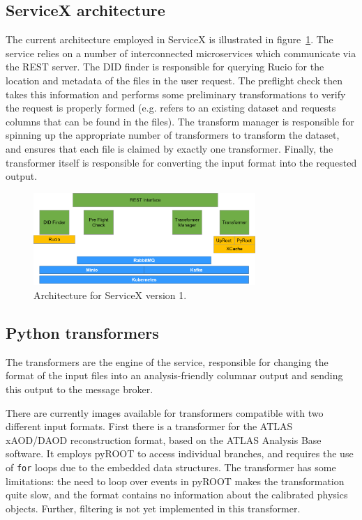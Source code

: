 \documentclass{webofc}
\begin{document}
\subsection{ServiceX architecture}
\label{subsec:architect}

The current architecture employed in ServiceX is illustrated in figure~\ref{fig:architectureV1}.
The service relies on a number of interconnected microservices which communicate via the REST
server. The DID finder is responsible for querying Rucio for the location and metadata of the files
in the user request. The preflight check then takes this information and performs some preliminary
transformations to verify the request is properly formed (e.g. refers to an existing dataset and
requests columns that can be found in the files). The transform manager is responsible for spinning
up the appropriate number of transformers to transform the dataset, and ensures that each file is
claimed by exactly one transformer. Finally, the transformer itself is responsible for converting
the input format into the requested output.


\begin{figure}[ht]
  \centering
  \includegraphics[width=0.75\textwidth]{architectureV1}
  \caption{Architecture for ServiceX version 1.}
  \label{fig:architectureV1}
\end{figure}

\subsection{Python transformers}
\label{subsec:pyTransform}

The transformers are the engine of the service, responsible for changing the format of the input
files into an analysis-friendly columnar output and sending this output to the message broker.

There are currently images available for transformers compatible with two different input formats.
First there is a transformer for the ATLAS xAOD/DAOD reconstruction format, based on the ATLAS
Analysis Base software. It employs pyROOT to access individual branches, and requires the use of
\texttt{for} loops due to the embedded data structures. The transformer has some limitations: the
need to loop over events in pyROOT makes the transformation quite slow, and the format contains no
information about the calibrated physics objects. Further, filtering is not yet implemented in this
transformer.
\end{document}
